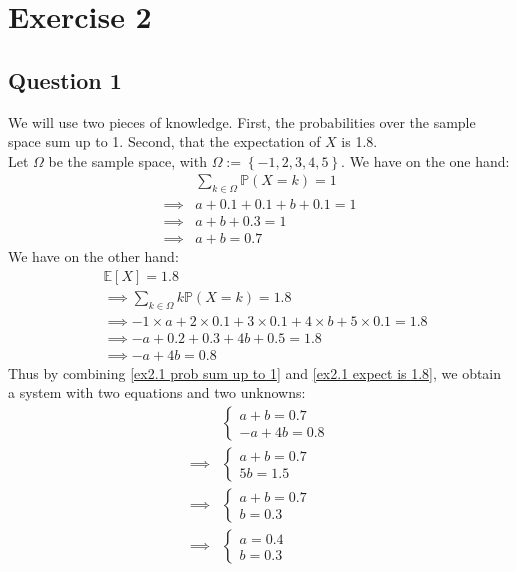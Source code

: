 \documentclass{article}
\renewcommand{\P}{\mathbb{P}}
\newcommand{\E}{\mathbb{E}}
\begin{document}
\section{Exercise 2}
\subsection{Question 1}

We will use two pieces of knowledge. First, the probabilities over the sample space sum up to 1. Second, that the expectation of \(X\) is 1.8. \\
Let \(\Omega\) be the sample space, with \(\Omega := \left\{ -1, 2, 3, 4, 5 \right\}\). We have on the one hand:
\begin{align}
    \nonumber
             & \sum_{k \in \Omega} \P(X=k) = 1 \\
    \nonumber
    \implies & a + 0.1 + 0.1 + b + 0.1 = 1     \\
    \nonumber
    \implies & a + b + 0.3 = 1                 \\
    \label{ex2.1 prob sum up to 1}
    \implies & a + b = 0.7
\end{align}
We have on the other hand:
\begin{align}
    \nonumber
     & \E[X] = 1.8                                                                          \\
    \nonumber
     & \implies \sum_{k \in \Omega} k\P(X=k) = 1.8                                          \\
    \nonumber
     & \implies -1 \times a + 2 \times 0.1 + 3 \times 0.1 + 4 \times b + 5 \times 0.1 = 1.8 \\
    \nonumber
     & \implies -a + 0.2 + 0.3 + 4b + 0.5 = 1.8                                             \\
    \label{ex2.1 expect is 1.8}
     & \implies -a + 4b= 0.8
\end{align}
Thus by combining \eqref{ex2.1 prob sum up to 1} and \eqref{ex2.1 expect is 1.8}, we obtain a system with two equations and two unknowns:
\begin{align*}
             & \begin{cases}
        a + b = 0.7 \\
        -a + 4b = 0.8
    \end{cases} \\
    \implies &
    \begin{cases}
        a + b = 0.7 \\
        5b = 1.5
    \end{cases}            \\
    \implies &
    \begin{cases}
        a + b = 0.7 \\
        b = 0.3
    \end{cases}           \\
    \implies &
    \begin{cases}
        a = 0.4 \\
        b = 0.3
    \end{cases}           \\
\end{align*}
\end{document}
